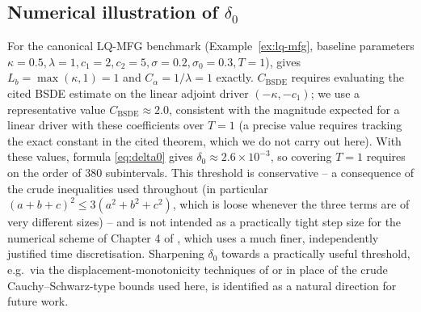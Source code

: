 \documentclass[11pt]{article}
\theoremstyle{remark}
\begin{document}
\subsection{Numerical illustration of $\delta_0$}

For the canonical LQ-MFG benchmark (Example~\ref{ex:lq-mfg}, baseline parameters
$\kappa=0.5,\lambda=1,c_1=2,c_2=5,\sigma=0.2,\sigma_0=0.3,T=1$),
 gives $L_b=\max(\kappa,1)=1$ and $C_\alpha=1/\lambda=1$
exactly. $C_{\mathrm{BSDE}}$ requires evaluating the cited BSDE estimate on the
linear adjoint driver $(-\kappa,-c_1)$; we use a representative value
$C_{\mathrm{BSDE}} \approx 2.0$, consistent with the magnitude expected for a
linear driver with these coefficients over $T=1$ (a precise value requires
tracking the exact constant in the cited theorem, which we do not carry out here).
With these values, formula
\eqref{eq:delta0} gives $\delta_0 \approx 2.6\times 10^{-3}$, so covering $T=1$
requires on the order of $380$ subintervals. This threshold is conservative -- a
consequence of the crude inequalities used throughout (in particular
$(a+b+c)^2\le 3(a^2+b^2+c^2)$, which is loose whenever the three terms are of very
different sizes) -- and is not intended as a practically tight step size for the
numerical scheme of Chapter 4 of \citet{monyimba2026thesis}, which uses a much
finer,
independently justified time discretisation. Sharpening $\delta_0$ towards a
practically useful threshold, e.g.\ via the displacement-monotonicity techniques of
\citet{jacksontangpi2024} or \citet{jacksonmeszaros2025} in place of the crude
Cauchy--Schwarz-type bounds used here, is identified as a natural direction for
future work.
\end{document}
